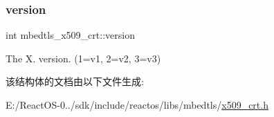 \subsubsection{\texorpdfstring{version}{version}}
{\footnotesize\ttfamily int mbedtls\+\_\+x509\+\_\+crt\+::version}

The X. version. (1=v1, 2=v2, 3=v3) 

该结构体的文档由以下文件生成\+:\begin{DoxyCompactItemize}
\item 
E\+:/\+React\+O\+S-\/0../sdk/include/reactos/libs/mbedtls/\hyperlink{x509__crt_8h}{x509\+\_\+crt.\+h}\end{DoxyCompactItemize}
